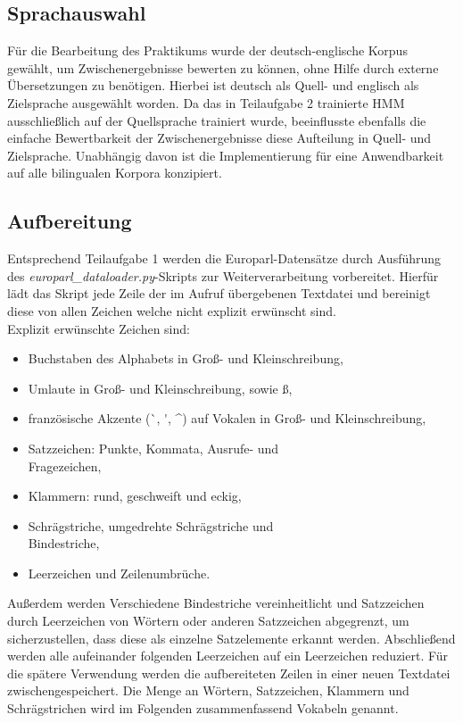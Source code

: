 \documentclass[conference]{IEEEtran}
\begin{document}
\subsection{Sprachauswahl}
Für die Bearbeitung des Praktikums wurde der deutsch-englische Korpus gewählt, um Zwischenergebnisse bewerten zu können, ohne Hilfe durch externe Übersetzungen zu benötigen.
Hierbei ist deutsch als Quell- und englisch als Zielsprache ausgewählt worden.
Da das in Teilaufgabe 2 trainierte HMM ausschließlich auf der Quellsprache trainiert wurde, beeinflusste ebenfalls die einfache Bewertbarkeit der Zwischenergebnisse diese Aufteilung in Quell- und Zielsprache.
Unabhängig davon ist die Implementierung für eine Anwendbarkeit auf alle bilingualen Korpora konzipiert.

\subsection{Aufbereitung}
Entsprechend Teilaufgabe 1 werden die Europarl-Datensätze durch Ausführung des \textit{europarl\_dataloader.py}-Skripts zur Weiterverarbeitung vorbereitet.
Hierfür lädt das Skript jede Zeile der im Aufruf übergebenen Textdatei und bereinigt diese von allen Zeichen welche nicht explizit erwünscht sind. \\
Explizit erwünschte Zeichen sind:
\begin{itemize}
    \item Buchstaben des Alphabets in Groß- und Kleinschreibung,
    \item Umlaute in Groß- und Kleinschreibung, sowie ß,
    \item französische Akzente (\`{\space}, \'{\space}, \^{\space}) auf Vokalen in Groß- und Kleinschreibung,
    \item Satzzeichen: Punkte, Kommata, Ausrufe- und \\ Fragezeichen,
    \item Klammern: rund, geschweift und eckig,
    \item Schrägstriche, umgedrehte Schrägstriche und \\ Bindestriche,
    \item Leerzeichen und Zeilenumbrüche.
\end{itemize}
Außerdem werden Verschiedene Bindestriche vereinheitlicht und Satzzeichen durch Leerzeichen von Wörtern oder anderen Satzzeichen abgegrenzt, um sicherzustellen, dass diese als einzelne Satzelemente erkannt werden.
Abschließend werden alle aufeinander folgenden Leerzeichen auf ein Leerzeichen reduziert.
Für die spätere Verwendung werden die aufbereiteten Zeilen in einer neuen Textdatei zwischengespeichert.
Die Menge an Wörtern, Satzzeichen, Klammern und Schrägstrichen wird im Folgenden zusammenfassend Vokabeln genannt.
\end{document}
